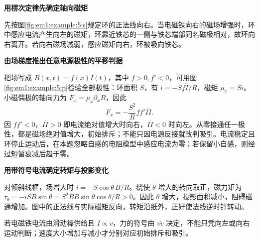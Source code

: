 \begin{solution}\textbf{用楞次定律先确定轴向磁矩}\par\nobreak
先按图\ref{fig:em1:example:5:s}规定环的正法线向右。当电磁铁向右的磁场增强时，环中感应电流产生向左的磁矩，环靠近铁芯的一侧与铁芯端部同名磁极相对，故环向右离开。若向右磁场减弱，感应磁矩向右，环被吸向铁芯。



\par\medskip{}\noindent\textbf{由场梯度推出任意电源极性的平移判据}\par\nobreak
把场写成 $B(x,t)=f(x)I(t)$，其中 $f>0,f'<0$，可用图\ref{fig:em1:example:5:p}检验全部极性：环面积 $S$，有 $i=-Sf\dot I/R$，磁矩 $\mu_x=Si$。小磁偶极的轴向力为 $F_x=\mu_x\partial_xB$，因此
\[F_x=-\frac{S^2}{R}ff'I\dot I.\]
因 $ff'<0$，$I\dot I>0$ 即电流绝对值增大时向右，$I\dot I<0$ 时向左。从零接通任一极性，都是磁场绝对值增大，初始排斥；不能只因电源反接就改判吸引。电流稳定且环停止运动后，在本题忽略自感的电阻模型中感应电流为零；若保留小自感，则经过短暂衰减后趋于零。



\par\medskip{}\noindent\textbf{用带符号电流确定转矩与投影变化}\par\nobreak
对倾斜线框，场增大时 $i=-S\cos\theta\,\dot B/R$。绕使 $\theta$ 增大的转向取正，磁力矩为 $\tau_\theta=-iSB\sin\theta=S^2B\dot B\sin\theta\cos\theta/R>0$。因此 $\theta$ 增大，投影面积减小，阻碍磁通增加。图中的正法线与实际磁矩反向，转矩沿纸外，正好使法线逆时针转动。

若电磁铁电流由滑动棒供给且 $I\propto v$，力的符号由 $v\dot v$ 决定，不能只凭向左或向右运动判断；速度大小增加与减小才分别对应初始排斥和吸引。\end{solution}
